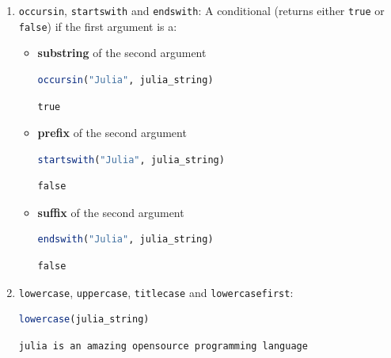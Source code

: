\documentclass[
  notoc %
]{tufte-book}
\newcommand{\passthrough}[1]{#1}
\begin{document}
\begin{enumerate}
\def\labelenumi{\arabic{enumi}.}
\item
  \passthrough{\lstinline!occursin!},
  \passthrough{\lstinline!startswith!} and
  \passthrough{\lstinline!endswith!}: A conditional (returns either
  \passthrough{\lstinline!true!} or \passthrough{\lstinline!false!}) if
  the first argument is a:

  \begin{itemize}
  \item
    \textbf{substring} of the second argument

    \begin{lstlisting}[language=Julia]
    occursin("Julia", julia_string)
    \end{lstlisting}

    \begin{lstlisting}[language=Output]
    true
    \end{lstlisting}
  \item
    \textbf{prefix} of the second argument

    \begin{lstlisting}[language=Julia]
    startswith("Julia", julia_string)
    \end{lstlisting}

    \begin{lstlisting}[language=Output]
    false
    \end{lstlisting}
  \item
    \textbf{suffix} of the second argument

    \begin{lstlisting}[language=Julia]
    endswith("Julia", julia_string)
    \end{lstlisting}

    \begin{lstlisting}[language=Output]
    false
    \end{lstlisting}
  \end{itemize}
\item
  \passthrough{\lstinline!lowercase!},
  \passthrough{\lstinline!uppercase!},
  \passthrough{\lstinline!titlecase!} and
  \passthrough{\lstinline!lowercasefirst!}:

  \begin{lstlisting}[language=Julia]
  lowercase(julia_string)
  \end{lstlisting}

  \begin{lstlisting}[language=Output]
  julia is an amazing opensource programming language
  \end{lstlisting}


\end{enumerate}
\end{document}

